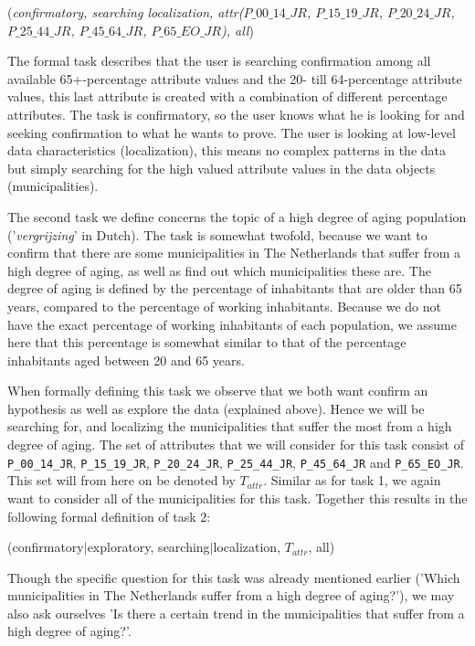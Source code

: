 (\textit{confirmatory, searching localization, attr($P\_00\_14\_JR$, $P\_15\_19\_JR$, $P\_20\_24\_JR$, $P\_25\_44\_JR$, $P\_45\_64\_JR$, $P\_65\_EO\_JR$), all})

The formal task describes that the user is searching confirmation among all available 65+-percentage attribute values and the 20- till 64-percentage attribute values, this last attribute is created with a combination of different percentage attributes.
The task is confirmatory, so the user knows what he is looking for and seeking confirmation to what he wants to prove.
The user is looking at low-level data characteristics (localization), this means no complex patterns in the data but simply searching for the high valued attribute values in the data objects (municipalities). 



The second task we define concerns the topic of a high degree of aging population ('\textit{vergrijzing}' in Dutch). The task is somewhat twofold, because we want to confirm that there are some municipalities in The Netherlands that suffer from a high degree of aging, as well as find out which municipalities these are. The degree of aging is defined by the percentage of inhabitants that are older than 65 years, compared to the percentage of working inhabitants. Because we do not have the exact percentage of working inhabitants of each population, we assume here that this percentage is somewhat similar to that of the percentage inhabitants aged between 20 and 65 years.

When formally defining this task we observe that we both want confirm an hypothesis as well as explore the data (explained above). Hence we will be searching for, and localizing the municipalities that suffer the most from a high degree of aging. The set of attributes that we will consider for this task consist of \texttt{P\_00\_14\_JR}, \texttt{P\_15\_19\_JR}, \texttt{P\_20\_24\_JR}, \texttt{P\_25\_44\_JR}, \texttt{P\_45\_64\_JR} and \texttt{P\_65\_EO\_JR}. This set will from here on be denoted by $T_{attr}$. Similar as for task 1, we again want to consider all of the municipalities for this task. Together this results in the following formal definition of task 2:

(confirmatory$|$exploratory, searching$|$localization, $T_{attr}$, all)

Though the specific question for this task was already mentioned earlier ('Which municipalities in The Netherlands suffer from a high degree of aging?'), we may also ask ourselves 'Is there a certain trend in the municipalities that suffer from a high degree of aging?'.